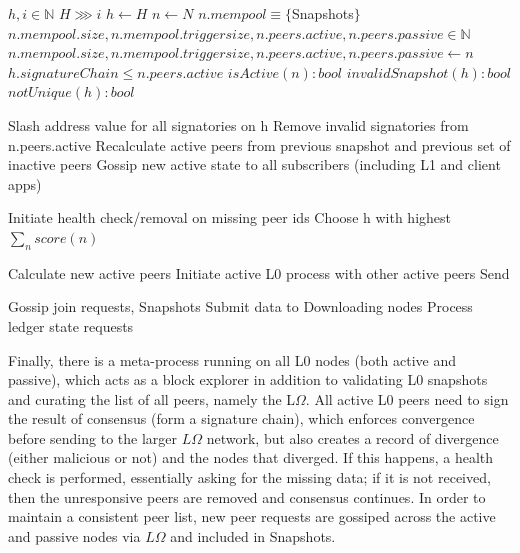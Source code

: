\documentclass{article}
\theoremstyle{definition}
\theoremstyle{remark}
\theoremstyle{plain}
\begin{document}
\begin{algorithm}
\caption{$L \Omega$}\label{alg:cap}
\begin{algorithmic}
\State $h, i \in \mathbb{N}$
\State $H \ggg  i$
\State $h \gets H$
\State $n \gets N$ 
\State $n.mempool \equiv \{ $Snapshots$ \}$
\State $n.mempool.size, n.mempool.triggersize, n.peers.active, n.peers.passive \in \mathbb{N}$
\State $n.mempool.size, n.mempool.triggersize, n.peers.active, n.peers.passive \gets n$ 
\State $h.signatureChain \leq n.peers.active$ 
\State $isActive(n): bool$
\State $invalidSnapshot(h): bool$
\State $notUnique(h): bool$

		\State Slash address value for all signatories on h
		\State Remove invalid signatories from n.peers.active
			\State Recalculate active peers from previous snapshot and previous set of inactive peers
			\State Gossip new active state to all subscribers (including L1 and client apps)
		\EndIf
		
			\State Initiate health check/removal on missing peer ids
		\EndIf
		\State Choose h with highest $\sum_n{score(n)}$

    			\State Calculate new active peers
				\State Initiate active L0 process with other active peers
			\EndIf
    		\State Send 
		
	    		\State Gossip join requests, Snapshots
			\State Submit data to Downloading nodes
			\State Process ledger state requests
		
	\EndIf
\EndFor
\end{algorithmic}
\end{algorithm}

Finally, there is a meta-process running on all L0 nodes (both active and passive), which acts as a block explorer in addition to validating L0 snapshots and curating the list of all peers, namely the L$\Omega$. All active L0 peers need to sign the result of consensus (form a signature chain), which enforces convergence before sending to the larger $L\Omega$ network, but also creates a record of divergence (either malicious or not) and the nodes that diverged. If this happens, a health check is performed, essentially asking for the missing data; if it is not received, then the unresponsive peers are removed and consensus continues. In order to maintain a consistent peer list, new peer requests are gossiped across the active and passive nodes via $L\Omega$ and included in Snapshots.
\end{document}
